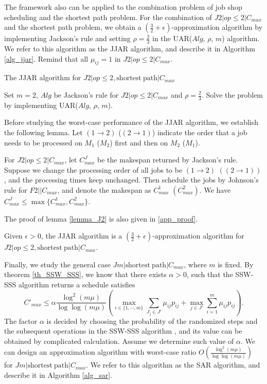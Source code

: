 \documentclass{llncs}
\newcommand{\be}{\begin{equation}}
\newcommand{\ee}{\end{equation}}
\numberwithin{subcase}{case}
\begin{document}
The framework also can be applied to the combination problem of job shop scheduling and the shortest path problem. For the combination of $J2|op\leq 2|C_{max}$ and the shortest path problem, we obtain a $(\frac{3}{2}+ \epsilon)$-approximation algorithm by implementing Jackson's rule and setting $\rho = \frac{2}{3}$ in the UAR($Alg$, $\rho$, $m$) algorithm. We refer to this algorithm as the JJAR algorithm, and describe it in Algorithm \ref{alg_jjar}. Remind that all $\mu_{ij} = 1$ in $J2|op\leq 2|C_{max}$.

\begin{algorithm}[htb]
\caption{The JJAR algorithm for $J2|op\leq 2, \mathrm{shortest}~\mathrm{path}|C_{max}$}
\label{alg_jjar}
\begin{algorithmic}[1]
\STATE Set $m = 2$, $Alg$ be Jackson's rule for $J2|op\leq 2|C_{max}$ and $\rho = \frac{2}{3}$.
\STATE Solve the problem by implementing UAR($Alg$, $\rho$, $m$).
\end{algorithmic}
\end{algorithm}

Before studying the worst-case performance of the JJAR algorithm, we establish the following lemma. Let $(1\rightarrow2)$ ($(2\rightarrow1)$) indicate the order that a job needs to be processed on $M_1$ ($M_2$) first and then on $M_2$ ($M_1$).

\begin{lemma}
For $J2|op \leq 2|C_{max}$, let $C^J_{max}$ be the makespan returned by Jackson's rule. Suppose we change the processing order of all jobs to be $(1\rightarrow2)$ $((2\rightarrow1))$, and the processing times keep unchanged. Then schedule the jobs by Johnson's rule for $F2||C_{max}$, and denote the makespan as $C^1_{max}$ $(C^2_{max})$. We have $C^J_{max}\leq \max\{C^{1}_{max}, C^2_{max}\}$. \label{lemma_J2}
\end{lemma}

The proof of lemma \ref{lemma_J2} is also given in \ref{app_proof}.
\begin{theorem}
Given $\epsilon > 0$, the JJAR algorithm is a $(\frac{3}{2}+\epsilon)$-approximation algorithm for $J2|op\leq 2, \mathrm{shortest}~\mathrm{path}|C_{max}$.  \label{th_jjar}
\end{theorem}

Finally, we study the general case $Jm|\mathrm{shortest}~\mathrm{path}|C_{max}$, where $m$ is fixed. By theorem \ref{th_SSW_SSS}, we know that there exists $\alpha > 0$, such that the SSW-SSS algorithm returns a schedule satisfies
\be
C'_{max} \leq\alpha\frac{\log^2(m\mu)}{\log{\log(m\mu)}}\left(\max_{i\in\{1,\cdots,m\}}{\sum_{J_j\in J'}\mu_{ij}p_{ij}}+ \max_{j\in J'}{\sum^{m}_{i=1}\mu_{ij}p_{ij}}\right).\label{eq:sjar_1}
\ee
The factor $\alpha$ is decided by choosing the probability of the randomized steps and the subsequent operations in the SSW-SSS algorithm \cite{Shmoys1994,Schmidt1995}, and its value can be obtained by complicated calculation. Assume we determine such value of $\alpha$. We can design an approximation algorithm with worst-case ratio $O\left(\frac{\log^2(m\mu)}{\log{\log(m\mu)}}\right)$ for $Jm|\mathrm{shortest}~\mathrm{path}|C_{max}$. We refer to this algorithm as the SAR algorithm, and describe it in Algorithm \ref{alg_sar}.
\end{document}
